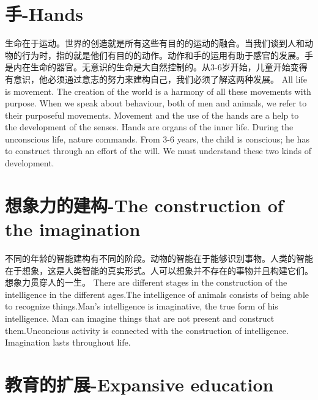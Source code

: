 \documentclass[lang=cn,10pt]{elegantbook}
\begin{document}
\chapter{手-Hands}

\begin{tcolorbox}[title=摘要,
colback=red!5!white,
colframe=red!75!black,
fonttitle=\bfseries]
生命在于运动。世界的创造就是所有这些有目的的运动的融合。当我们谈到人和动物的行为时，指的就是他们有目的的动作。动作和手的运用有助于感官的发展。手是内在生命的器官。无意识的生命是大自然控制的。从3-6岁开始，儿童开始变得有意识，他必须通过意志的努力来建构自己，我们必须了解这两种发展。
All life is movement. The creation of the world is a harmony of all these movements with purpose. When we speak about behaviour, both of men and animals, we refer to their purposeful movements. Movement and the use of the hands are a help to the development of the senses. Hands are organs of the inner life. During the unconscious life, nature commands. From 3-6 years, the child is conscious; he has to construct through an effort of the will. We must understand these two kinds of development.
\end{tcolorbox}

\chapter{想象力的建构-The construction of the imagination}

\begin{tcolorbox}[title=摘要,
colback=red!5!white,
colframe=red!75!black,
fonttitle=\bfseries]
不同的年龄的智能建构有不同的阶段。动物的智能在于能够识别事物。人类的智能在于想象，这是人类智能的真实形式。人可以想象并不存在的事物并且构建它们。想象力贯穿人的一生。
There are different stages in the construction of the intelligence in the different ages.The intelligence of animals consists of being able to recognize things.Man's intelligence is imaginative, the true form of his intelligence. Man can imagine things that are not present and construct them.Unconcious activity is connected with the construction of intelligence. Imagination lasts throughout life.
\end{tcolorbox}

\chapter{教育的扩展-Expansive education}
\end{document}
